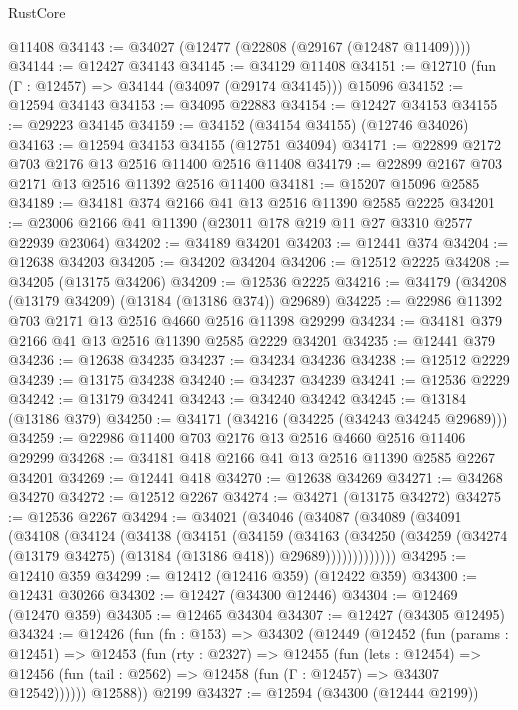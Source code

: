\begin{lexlean}{RustCore}
\begin{coremodule}
    @11408
@34143 := @34027 (@12477 (@22808 (@29167 (@12487 @11409))))
@34144 := @12427 @34143
@34145 := @34129 @11408
@34151 := @12710 (fun (Γ : @12457) => @34144 (@34097 (@29174 @34145))) @15096
@34152 := @12594 @34143
@34153 := @34095 @22883
@34154 := @12427 @34153
@34155 := @29223 @34145
@34159 := @34152 (@34154 @34155) (@12746 @34026)
@34163 := @12594 @34153 @34155 (@12751 @34094)
@34171 := @22899 @2172 @703 @2176 @13 @2516 @11400 @2516 @11408
@34179 := @22899 @2167 @703 @2171 @13 @2516 @11392 @2516 @11400
@34181 := @15207 @15096 @2585
@34189 := @34181 @374 @2166 @41 @13 @2516 @11390 @2585 @2225
@34201 := @23006 @2166 @41 @11390 (@23011 @178 @219 @11 @27 @3310 @2577 @22939 @23064)
@34202 := @34189 @34201
@34203 := @12441 @374
@34204 := @12638 @34203
@34205 := @34202 @34204
@34206 := @12512 @2225
@34208 := @34205 (@13175 @34206)
@34209 := @12536 @2225
@34216 := @34179 (@34208 (@13179 @34209) (@13184 (@13186 @374)) @29689)
@34225 := @22986 @11392 @703 @2171 @13 @2516 @4660 @2516 @11398 @29299
@34234 := @34181 @379 @2166 @41 @13 @2516 @11390 @2585 @2229 @34201
@34235 := @12441 @379
@34236 := @12638 @34235
@34237 := @34234 @34236
@34238 := @12512 @2229
@34239 := @13175 @34238
@34240 := @34237 @34239
@34241 := @12536 @2229
@34242 := @13179 @34241
@34243 := @34240 @34242
@34245 := @13184 (@13186 @379)
@34250 := @34171 (@34216 (@34225 (@34243 @34245 @29689)))
@34259 := @22986 @11400 @703 @2176 @13 @2516 @4660 @2516 @11406 @29299
@34268 := @34181 @418 @2166 @41 @13 @2516 @11390 @2585 @2267 @34201
@34269 := @12441 @418
@34270 := @12638 @34269
@34271 := @34268 @34270
@34272 := @12512 @2267
@34274 := @34271 (@13175 @34272)
@34275 := @12536 @2267
@34294 := @34021
    (@34046
      (@34087
        (@34089
          (@34091
            (@34108
              (@34124
                (@34138
                  (@34151
                    (@34159
                      (@34163
                        (@34250
                          (@34259 (@34274 (@13179 @34275) (@13184 (@13186 @418)) @29689)))))))))))))
@34295 := @12410 @359
@34299 := @12412 (@12416 @359) (@12422 @359)
@34300 := @12431 @30266
@34302 := @12427 (@34300 @12446)
@34304 := @12469 (@12470 @359)
@34305 := @12465 @34304
@34307 := @12427 (@34305 @12495)
@34324 := @12426
    (fun (fn : @153) =>
    @34302
      (@12449
        (@12452
          (fun (params : @12451) =>
          @12453
            (fun (rty : @2327) =>
            @12455
              (fun (lets : @12454) =>
              @12456 (fun (tail : @2562) => @12458 (fun (Γ : @12457) => @34307 @12542))))))
        @12588))
    @2199
@34327 := @12594 (@34300 (@12444 @2199))

\end{coremodule}
\end{lexlean}
